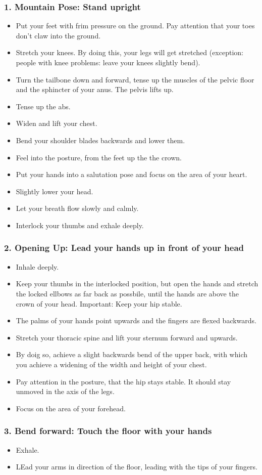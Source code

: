 \documentclass[../Book.Stress_regulation.tex]{subfiles}
\begin{document}
\subsubsection{1. Mountain Pose: Stand upright}
\begin{itemize}
\item Put your feet with frim pressure on the ground. Pay attention that your toes don't claw into the ground.
\item Stretch your knees. By doing this, your legs will get stretched (exception: people with knee problems: leave your knees slightly bend).
\item Turn the tailbone down and forward, tense up the muscles of the pelvic floor and the sphincter of your anus. The pelvis lifts up.
\item Tense up the abs.
\item Widen and lift your chest.
\item Bend your shoulder blades backwards and lower them.
\item Feel into the posture, from the feet up the the crown.
\item Put your hands into a salutation pose and focus on the area of your heart.
\item Slightly lower your head.
\item Let your breath flow slowly and calmly.
\item Interlock your thumbs and exhale deeply.
\end{itemize}

\subsubsection{2. Opening Up: Lead your hands up in front of your head}

\begin{itemize}
\item Inhale deeply.
\item Keep your thumbs in the interlocked position, but open the hands and stretch the locked ellbows as far back as possbile, until the hands are above the crown of your head. Important: Keep your hip stable.
\item The palms of your hands point upwards and the fingers are flexed backwards.
\item Stretch your thoracic spine and lift your sternum forward and upwards.
\item By doig so, achieve a slight backwards bend of the upper back, with which you achieve a widening of the width and height of your chest.
\item Pay attention in the posture, that the hip stays stable. It should stay unmoved in the axis of the legs.
\item Focus on the area of your forehead.
\end{itemize}

\subsubsection{3. Bend forward: Touch the floor with your hands}

\begin{itemize}
\item Exhale.
  \item LEad your arms in direction of the floor, leading with the tips of your fingers. 

\end{itemize}
  
\end{document}
